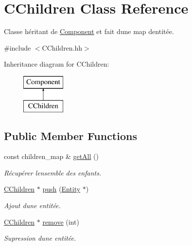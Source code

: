 \hypertarget{class_c_children}{}\section{C\+Children Class Reference}
\label{class_c_children}


Classe héritant de \hyperlink{class_component}{Component} et fait d\textquotesingle{}une map d\textquotesingle{}entitée.  




{\ttfamily \#include $<$C\+Children.\+hh$>$}

Inheritance diagram for C\+Children\+:\begin{figure}[H]
\begin{center}
\leavevmode
\includegraphics[height=2.000000cm]{class_c_children}
\end{center}
\end{figure}
\subsection*{Public Member Functions}
\begin{DoxyCompactItemize}
\item 
const children\+\_\+map \& \hyperlink{class_c_children_aa02a9a499b3cb60e36d43b049db5dd3a}{get\+All} ()
\begin{DoxyCompactList}\small\item\em Récupérer l\textquotesingle{}ensemble des enfants. \end{DoxyCompactList}\item 
\hyperlink{class_c_children}{C\+Children} $\ast$ \hyperlink{class_c_children_a993c1f483adcba2fee4fbd0e7f13fb33}{push} (\hyperlink{class_entity}{Entity} $\ast$)
\begin{DoxyCompactList}\small\item\em Ajout d\textquotesingle{}une entitée. \end{DoxyCompactList}\item 
\hyperlink{class_c_children}{C\+Children} $\ast$ \hyperlink{class_c_children_a000d123c781df5d6e2000e2799456963}{remove} (int)
\begin{DoxyCompactList}\small\item\em Supression d\textquotesingle{}une entitée. \end{DoxyCompactList}\end{DoxyCompactItemize}

